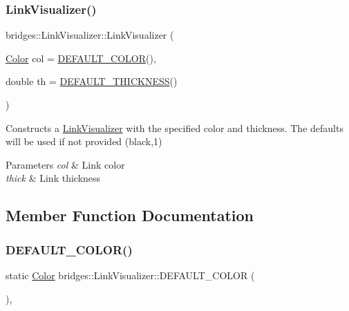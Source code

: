 \subsubsection{\texorpdfstring{LinkVisualizer()}{LinkVisualizer()}}
{\footnotesize\ttfamily bridges\+::\+Link\+Visualizer\+::\+Link\+Visualizer (\begin{DoxyParamCaption}\item[{\mbox{\hyperlink{classbridges_1_1_color}{Color}}}]{col = {\ttfamily \mbox{\hyperlink{classbridges_1_1_link_visualizer_a5e121c52fc270337c58413d0fd72cf58}{D\+E\+F\+A\+U\+L\+T\+\_\+\+C\+O\+L\+OR}}()},  }\item[{double}]{th = {\ttfamily \mbox{\hyperlink{classbridges_1_1_link_visualizer_a6d05e052d64964d876f557901635079d}{D\+E\+F\+A\+U\+L\+T\+\_\+\+T\+H\+I\+C\+K\+N\+E\+SS}}()} }\end{DoxyParamCaption})\hspace{0.3cm}{\ttfamily [inline]}}

Constructs a \mbox{\hyperlink{classbridges_1_1_link_visualizer}{Link\+Visualizer}} with the specified color and thickness. The defaults will be used if not provided (black,1)


\begin{DoxyParams}{Parameters}
{\em col} & Link color \\
\hline
{\em thick} & Link thickness \\
\hline
\end{DoxyParams}


\subsection{Member Function Documentation}
\mbox{\label{classbridges_1_1_link_visualizer_a5e121c52fc270337c58413d0fd72cf58}} 
\subsubsection{\texorpdfstring{DEFAULT\_COLOR()}{DEFAULT\_COLOR()}}
{\footnotesize\ttfamily static \mbox{\hyperlink{classbridges_1_1_color}{Color}} bridges\+::\+Link\+Visualizer\+::\+D\+E\+F\+A\+U\+L\+T\+\_\+\+C\+O\+L\+OR (\begin{DoxyParamCaption}{ }\end{DoxyParamCaption})\hspace{0.3cm}{\ttfamily [inline]}, {\ttfamily [static]}}

